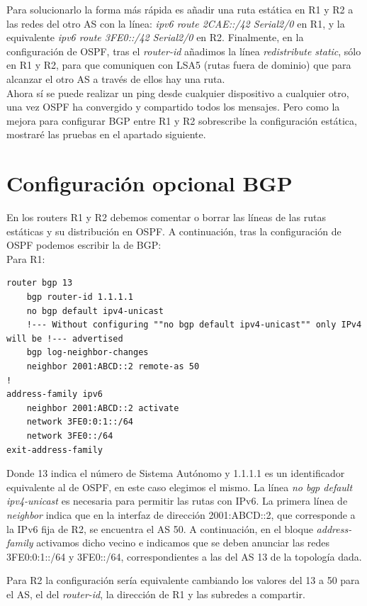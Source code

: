 \documentclass{article}
\begin{document}
Para solucionarlo la forma más rápida es añadir una ruta estática en R1 y R2 a las redes del otro AS con la línea: \textit{ipv6 route 2CAE::/42 Serial2/0} en R1, y la equivalente \textit{ipv6 route 3FE0::/42 Serial2/0} en R2. Finalmente, en la configuración de OSPF, tras el \textit{router-id} añadimos la línea \textit{redistribute static}, sólo en R1 y R2, para que comuniquen con LSA5 (rutas fuera de dominio) que para alcanzar el otro AS a través de ellos hay una ruta.
\\

Ahora sí se puede realizar un ping desde cualquier dispositivo a cualquier otro, una vez OSPF ha convergido y compartido todos los mensajes. Pero como la mejora para configurar BGP entre R1 y R2 sobrescribe la configuración estática, mostraré las pruebas en el apartado siguiente.


\section{Configuración opcional BGP}
En los routers R1 y R2 debemos comentar o borrar las líneas de las rutas estáticas y su distribución en OSPF. A continuación, tras la configuración de OSPF podemos escribir la de BGP:
\\

Para R1:
\begin{lstlisting}
router bgp 13
	bgp router-id 1.1.1.1
	no bgp default ipv4-unicast
	!--- Without configuring ""no bgp default ipv4-unicast"" only IPv4 will be !--- advertised
	bgp log-neighbor-changes
	neighbor 2001:ABCD::2 remote-as 50
!
address-family ipv6
	neighbor 2001:ABCD::2 activate
	network 3FE0:0:1::/64
	network 3FE0::/64
exit-address-family
\end{lstlisting}

Donde 13 indica el número de Sistema Autónomo y 1.1.1.1 es un identificador equivalente al de OSPF, en este caso elegimos el mismo. La línea \textit{no bgp default ipv4-unicast} es necesaria para permitir las rutas con IPv6. La primera línea de \textit{neighbor} indica que en la interfaz de dirección 2001:ABCD::2, que corresponde a la IPv6 fija de R2, se encuentra el AS 50. A continuación, en el bloque \textit{address-family} activamos dicho vecino e indicamos que se deben anunciar las redes 3FE0:0:1::/64 y 3FE0::/64, correspondientes a las del AS 13 de la topología dada.

Para R2 la configuración sería equivalente cambiando los valores del 13 a 50 para el AS, el del \textit{router-id}, la dirección de R1 y las subredes a compartir.
\\
\end{document}
